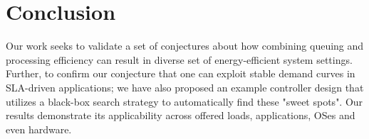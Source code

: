 \section{Conclusion}
\label{sec:conc}
Our work seeks to validate a set of conjectures about how combining queuing and processing efficiency can result in diverse set of energy-efficient system settings. Further, to confirm our conjecture that one can exploit stable demand curves in SLA-driven applications; we have also proposed an example controller design that utilizes a black-box search strategy to automatically find these "sweet spots". Our results demonstrate its applicability across offered loads, applications, OSes and even hardware.